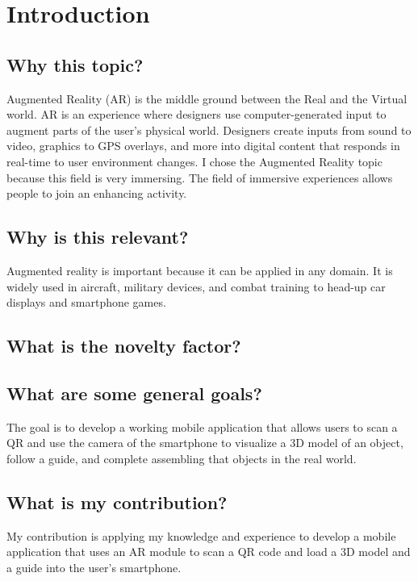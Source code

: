 \chapter{Introduction}\label{cap:introduction}

\section{Why this topic?}
Augmented Reality (AR) is the middle ground between the Real and the Virtual world.
AR is an experience where designers use computer-generated input to augment parts of the user's physical world. Designers create inputs from sound to video, graphics to GPS overlays, and more into digital content that responds in real-time to user environment changes.
I chose the Augmented Reality topic because this field is very immersing. The field of immersive experiences allows people to join an enhancing activity.

\section{Why is this relevant?}
Augmented reality is important because it can be applied in any domain. It is widely used in aircraft, military devices, and combat training to head-up car displays and smartphone games.

\section{What is the novelty factor?}


\section{What are some general goals?}
The goal is to develop a working mobile application that allows users to scan a QR and use the camera of the smartphone to visualize a 3D model of an object, follow a guide, and complete assembling that objects in the real world.

\section{What is my contribution?}
My contribution is applying my knowledge and experience to develop a mobile application that uses an AR module to scan a QR code and load a 3D model and a guide into the user's smartphone.



